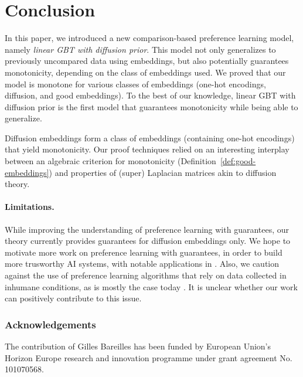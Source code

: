 \documentclass{article}
\begin{document}
\section{Conclusion}
\label{sec:conclusion}

In this paper,
we introduced a new comparison-based preference learning model,
namely \emph{linear GBT with diffusion prior}.
This model not only generalizes to previously uncompared data using embeddings, but also potentially guarantees monotonicity, depending on the class of embeddings used.
We proved that our model is monotone for various classes
of embeddings (one-hot encodings, diffusion, and good embeddings).
To the best of our knowledge,
linear GBT with diffusion prior
is the first model that guarantees monotonicity
while being able to generalize.

Diffusion embeddings form a class
of embeddings (containing one-hot encodings) 
that yield monotonicity. 
Our proof techniques relied on an interesting
interplay between an algebraic criterion 
for monotonicity (Definition~\ref{def:good-embeddings})
and properties of (super) Laplacian matrices akin to diffusion theory.

\paragraph*{Limitations.}
While improving the understanding of preference learning with guarantees, our theory currently provides guarantees for diffusion embeddings only.
We hope to motivate more work on preference learning with guarantees, in order to build more trusworthy AI systems, with notable applications in \cite{weyl2025prosocialmedia,hoang2021tournesolquestlargesecure,hoang2024solidagomodularcollaborativescoring,small2021polis}.
Also, we caution against the use of preference learning algorithms that rely on data collected in inhumane conditions, as is mostly the case today \cite{DW2025, perrigo2023exclusive, hao2023cleaning, ghanalawsuit}.
It is unclear whether our work can positively contribute to this issue.

\subsubsection*{Acknowledgements}
The contribution of Gilles Bareilles has been funded by European Union’s Horizon Europe research and innovation programme under grant agreement No. 101070568.
\end{document}
